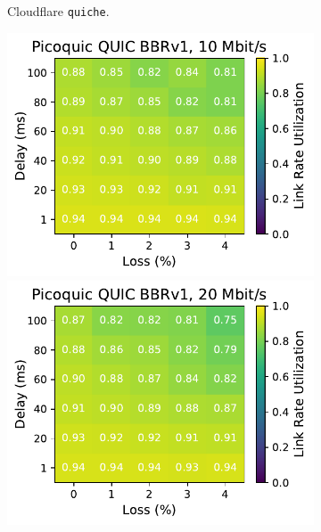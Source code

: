 \begin{figure}[ht]
\begin{subfigure}[b]{0.22\linewidth}
        \caption{Cloudflare \texttt{quiche}.}
    \end{subfigure}
    \begin{subfigure}[b]{0.22\linewidth}
        \includegraphics[width=\linewidth,trim={0 0 2cm 0},clip]{figures/heatmaps/heatmap_picoquic_bbr1_10mbps.pdf}
        \includegraphics[width=\linewidth,trim={0 0 2cm 0},clip]{figures/heatmaps/heatmap_picoquic_bbr1_20mbps.pdf}

\end{subfigure}
\end{figure}
